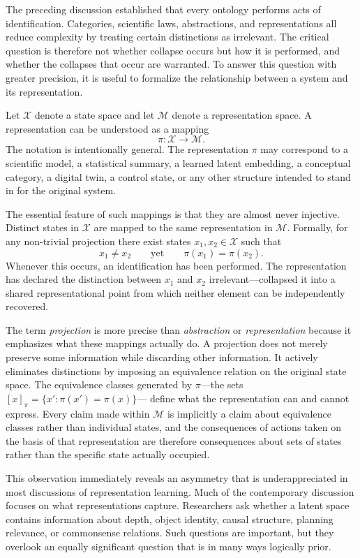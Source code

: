 \documentclass[12pt,a4paper]{article}
\theoremstyle{plain}
\theoremstyle{definition}
\theoremstyle{remark}
\begin{document}
The preceding discussion established that every ontology performs acts of
identification. Categories, scientific laws, abstractions, and
representations all reduce complexity by treating certain distinctions as
irrelevant. The critical question is therefore not whether collapse occurs
but how it is performed, and whether the collapses that occur are warranted.
To answer this question with greater precision, it is useful to formalize the
relationship between a system and its representation.

Let $\mathcal{X}$ denote a state space and let $\mathcal{M}$ denote a
representation space. A representation can be understood as a mapping
\[
  \pi : \mathcal{X} \rightarrow \mathcal{M}.
\]
The notation is intentionally general. The representation $\pi$ may
correspond to a scientific model, a statistical summary, a learned latent
embedding, a conceptual category, a digital twin, a control state, or any
other structure intended to stand in for the original system.

The essential feature of such mappings is that they are almost never
injective. Distinct states in $\mathcal{X}$ are mapped to the same
representation in $\mathcal{M}$. Formally, for any non-trivial projection
there exist states $x_1, x_2 \in \mathcal{X}$ such that
\[
  x_1 \neq x_2
  \qquad\text{yet}\qquad
  \pi(x_1) = \pi(x_2).
\]
Whenever this occurs, an identification has been performed. The representation
has declared the distinction between $x_1$ and $x_2$ irrelevant---collapsed
it into a shared representational point from which neither element can be
independently recovered.

The term \emph{projection} is more precise than \emph{abstraction} or
\emph{representation} because it emphasizes what these mappings actually do.
A projection does not merely preserve some information while discarding
other information. It actively eliminates distinctions by imposing an
equivalence relation on the original state space. The equivalence classes
generated by $\pi$---the sets $[x]_\pi = \{x' : \pi(x') = \pi(x)\}$---
define what the representation can and cannot express. Every claim made within
$\mathcal{M}$ is implicitly a claim about equivalence classes rather than
individual states, and the consequences of actions taken on the basis of that
representation are therefore consequences about sets of states rather than
the specific state actually occupied.

This observation immediately reveals an asymmetry that is underappreciated in
most discussions of representation learning. Much of the contemporary
discussion focuses on what representations capture. Researchers ask whether a
latent space contains information about depth, object identity, causal
structure, planning relevance, or commonsense relations. Such questions are
important, but they overlook an equally significant question that is in many
ways logically prior.
\end{document}

